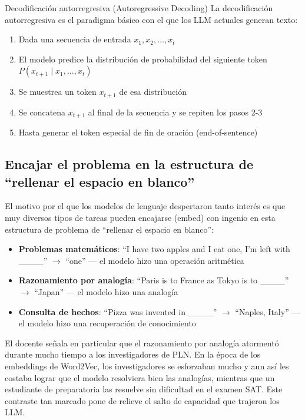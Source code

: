 \documentclass[a4paper]{article}
\begin{document}
\begin{knowledgebox}{Decodificación autorregresiva (Autoregressive Decoding)}
La decodificación autorregresiva es el paradigma básico con el que los LLM actuales generan texto:
\begin{enumerate}
    \item Dada una secuencia de entrada $x_1, x_2, \dots, x_t$
    \item El modelo predice la distribución de probabilidad del siguiente token $P(x_{t+1} \mid x_1, \dots, x_t)$
    \item Se muestrea un token $x_{t+1}$ de esa distribución
    \item Se concatena $x_{t+1}$ al final de la secuencia y se repiten los pasos 2-3
    \item Hasta generar el token especial de fin de oración (end-of-sentence)
\end{enumerate}
\end{knowledgebox}

\subsection{Encajar el problema en la estructura de ``rellenar el espacio en blanco''}

El motivo por el que los modelos de lenguaje despertaron tanto interés es que muy diversos tipos de tareas pueden encajarse (embed) con ingenio en esta estructura de problema de ``rellenar el espacio en blanco'':

\begin{itemize}
    \item \textbf{Problemas matemáticos}: ``I have two apples and I eat one, I'm left with \_\_\_\_'' $\rightarrow$ ``one'' — el modelo hizo una operación aritmética
    \item \textbf{Razonamiento por analogía}: ``Paris is to France as Tokyo is to \_\_\_\_'' $\rightarrow$ ``Japan'' — el modelo hizo una analogía
    \item \textbf{Consulta de hechos}: ``Pizza was invented in \_\_\_\_'' $\rightarrow$ ``Naples, Italy'' — el modelo hizo una recuperación de conocimiento
\end{itemize}

El docente señala en particular que el razonamiento por analogía atormentó durante mucho tiempo a los investigadores de PLN. En la época de los embeddings de Word2Vec, los investigadores se esforzaban mucho y aun así les costaba lograr que el modelo resolviera bien las analogías, mientras que un estudiante de preparatoria las resuelve sin dificultad en el examen SAT. Este contraste tan marcado pone de relieve el salto de capacidad que trajeron los LLM.
\end{document}

